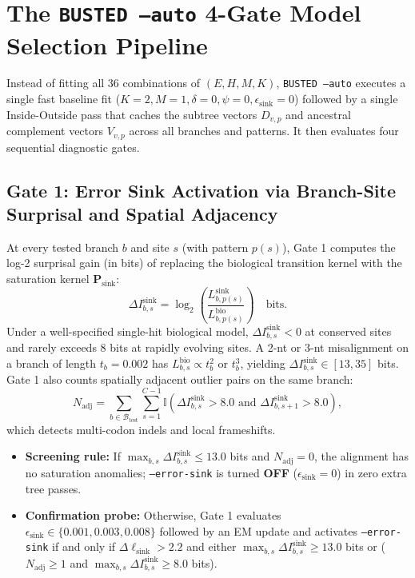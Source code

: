 \documentclass[11pt]{article}
\begin{document}
\section{The \texttt{BUSTED --auto} 4-Gate Model Selection Pipeline}

Instead of fitting all 36 combinations of $(E, H, M, K)$, \texttt{BUSTED --auto} executes a single fast baseline fit ($K=2, M=1, \delta=0, \psi=0, \epsilon_{\text{sink}}=0$) followed by a single Inside-Outside pass that caches the subtree vectors $D_{v,p}$ and ancestral complement vectors $V_{v,p}$ across all branches and patterns. It then evaluates four sequential diagnostic gates.

\subsection{Gate 1: Error Sink Activation via Branch-Site Surprisal and Spatial Adjacency}

At every tested branch $b$ and site $s$ (with pattern $p(s)$), Gate 1 computes the log-2 surprisal gain (in bits) of replacing the biological transition kernel with the saturation kernel $\bm{P}_{\text{sink}}$:
\begin{equation}
    \Delta I_{b,s}^{\text{sink}} = \log_2 \left( \frac{L_{b,p(s)}^{\text{sink}}}{L_{b,p(s)}^{\text{bio}}} \right) \quad \text{bits}.
\end{equation}
Under a well-specified single-hit biological model, $\Delta I_{b,s}^{\text{sink}} < 0$ at conserved sites and rarely exceeds $8$ bits at rapidly evolving sites. A 2-nt or 3-nt misalignment on a branch of length $t_b = 0.002$ has $L_{b,s}^{\text{bio}} \propto t_b^2$ or $t_b^3$, yielding $\Delta I_{b,s}^{\text{sink}} \in [13, 35]$ bits. Gate 1 also counts spatially adjacent outlier pairs on the same branch:
\begin{equation}
    N_{\text{adj}} = \sum_{b \in \mathcal{B}_{\text{test}}} \sum_{s=1}^{C-1} \mathbb{I}\left(\Delta I_{b,s}^{\text{sink}} > 8.0 \text{ and } \Delta I_{b,s+1}^{\text{sink}} > 8.0\right),
\end{equation}
which detects multi-codon indels and local frameshifts.
\begin{itemize}[nosep]
    \item \textbf{Screening rule:} If $\max_{b,s} \Delta I_{b,s}^{\text{sink}} \le 13.0$ bits and $N_{\text{adj}} = 0$, the alignment has no saturation anomalies; \texttt{--error-sink} is turned \textbf{OFF} ($\epsilon_{\text{sink}} = 0$) in zero extra tree passes.
    \item \textbf{Confirmation probe:} Otherwise, Gate 1 evaluates $\epsilon_{\text{sink}} \in \{0.001, 0.003, 0.008\}$ followed by an EM update and activates \texttt{--error-sink} if and only if $\Delta \ell_{\text{sink}} > 2.2$ and either $\max_{b,s} \Delta I_{b,s}^{\text{sink}} \ge 13.0$ bits or ($N_{\text{adj}} \ge 1$ and $\max_{b,s} \Delta I_{b,s}^{\text{sink}} \ge 8.0$ bits).
\end{itemize}
\end{document}
